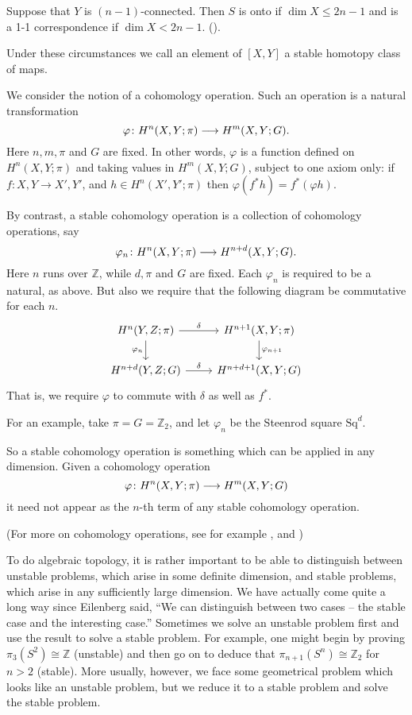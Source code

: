 \documentclass[../main]{subfiles}
\begin{document}
\begin{theorem}
    Suppose that $Y$ is $(n-1)$-connected. Then $S$ is onto if $\dim X \le 2n - 1$ and is a 1-1 correspondence if $\dim X < 2n - 1$. (\cite[p.~458]{spanier}).
\end{theorem}

Under these circumstances we call an element of $[X, Y]$ a stable homotopy class of maps.

\begin{example_different}
    We consider the notion of a cohomology operation. Such an operation is a natural transformation \[ \varphi \colon H^n(X, Y; \pi) \longrightarrow H^m(X, Y; G). \] Here $n, m, \pi$ and $G$ are fixed. In other words, $\varphi$ is a function defined on $H^n(X, Y; \pi)$ and taking values in $H^m(X, Y; G)$, subject to one axiom only: if $f \colon X, Y \to X', Y'$, and $h \in H^n(X', Y'; \pi)$ then $\varphi(f^*h) = f^*(\varphi h)$.
\end{example_different}

By contrast, a stable cohomology operation is a collection of cohomology operations, say \[\varphi_n \colon H^n(X, Y; \pi) \longrightarrow H^{n + d}(X, Y; G).\] Here $n$ runs over $\mathbb{Z}$, while $d, \pi$ and $G$ are fixed. Each $\varphi_n$ is required to be a natural, as above. But also we require that the following diagram be commutative for each $n$.
\[ 
\begin{tikzcd}
    H^n(Y, Z; \pi) \arrow[r, "\delta"] \arrow[d, "\varphi_n"'] & H^{n + 1}(X, Y; \pi) \arrow[d, "\varphi_{n + 1}"]\\ 
    H^{n + d}(Y, Z; G) \arrow[r, "\delta"] & H^{n + d + 1}(X, Y; G)
\end{tikzcd} 
\]
That is, we require $\varphi$ to commute with $\delta$ as well as $f^*$.

For an example, take $\pi = G = \mathbb Z_2$, and let $\varphi_n$ be the Steenrod square $\mathrm{Sq}^d$.

So a stable cohomology operation is something which can be applied in any dimension. Given a cohomology operation \[\varphi \colon H^n(X, Y; \pi) \longrightarrow H^m(X, Y; G) \] it need not appear as the $n$-th term of any stable cohomology operation.

(For more on cohomology operations, see for example \cite{moshertangora},\cite{steenrodepstein} and \cite[p. 429-403]{spanier})

To do algebraic topology, it is rather important to be able to distinguish between unstable problems, which arise in some definite dimension, and stable problems, which arise in any sufficiently large dimension. We have actually come quite a long way since Eilenberg said, ``We can distinguish between two cases -- the stable case and the interesting case.'' Sometimes we solve an unstable problem first and use the result to solve a stable problem. For example, one might begin by proving $\pi_3(S^2) \cong \mathbb{Z}$ (unstable) and then go on to deduce that $\pi_{n + 1}(S^n) \cong \mathbb{Z}_2$ for $n > 2$ (stable). More usually, however, we face some geometrical problem which looks like an unstable problem, but we reduce it to a stable problem and solve the stable problem.
\end{document}
